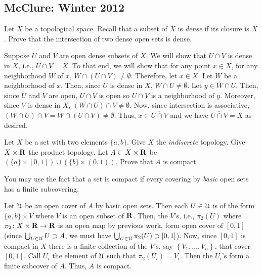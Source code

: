 \subsection{McClure: Winter 2012}
\setcounter{exercise}{0}

\begin{problem}
  Let $X$ be a topological space. Recall that a subset of $X$ is
  \emph{dense} if its closure is $X$. Prove that the intersection of two
  dense open sets is dense.
\end{problem}
\begin{solution}
  Suppose $U$ and $V$ are open dense subsets of $X$. We will show that
  $U\cap V$ is dense in $X$, i.e., $\overline{U\cap V}=X$. To that end, we
  will show that for any point $x\in X$, for any neighborhood $W$ of $x$,
  $W\cap(U\cap V)\neq\emptyset$. Therefore, let $x\in X$. Let $W$ be a
  neighborhood of $x$. Then, since $U$ is dense in $X$,
  $W\cap U\neq\emptyset$. Let $y\in W\cap U$. Then, since $U$ and $V$ are
  open, $U\cap V$ is open so $U\cap V$ is a neighborhood of $y$. Moreover,
  since $V$ is dense in $X$, $(W\cap U)\cap V\neq\emptyset$. Now, since
  intersection is associative,
  $(W\cap U)\cap V=W\cap(U\cap V)\neq\emptyset$. Thus,
  $x\in\overline{U\cap V}$ and we have $\overline{U\cap V}=X$ as desired.
\end{solution}

\begin{problem}
  Let $X$ be a set with two elements $\{a,b\}$. Give $X$ the
  \emph{indiscrete} topology. Give $X\times\mathbf{R}$ the product topology. Let
  $A\subset X\times\mathbf{R}$ be
  $(\{a\}\times[0,1])\cup(\{b\}\times(0,1))$. Prove that $A$ is compact.

  You may use the fact that a set is compact if every covering by
  \emph{basic} open sets has a finite subcovering.
\end{problem}
\begin{solution}
  Let $\mathcal{U}$ be an open cover of $A$ by basic open sets. Then each
  $U\in\mathcal{U}$ is of the form $\{a,b\}\times V$ where $V$ is an open subset
  of $\mathbf{R}$. Then, the $V$'s, i.e., $\pi_2(U)$ where
  $\pi_2\colon X\times\mathbf{R}\to\mathbf{R}$ is an open map by previous work, form
  open cover of $[0,1]$ (since $\bigcup_{U\in\mathcal{U}} U\supset A$, we must
  have $\bigcup_{U\in\mathcal{U}}\pi_2(U)\supset[0,1]$). Now, since $[0,1]$ is
  compact in $X$ there is a finite collection of the $V$'s, say
  $\left\{V_1,\dotsc,V_n\right\}$, that cover $[0,1]$. Call $U_i$ the
  element of $\mathcal{U}$ such that $\pi_2(U_i)=V_i$. Then the $U_i$'s form a
  finite subcover of $A$. Thus, $A$ is compact.
\end{solution}

